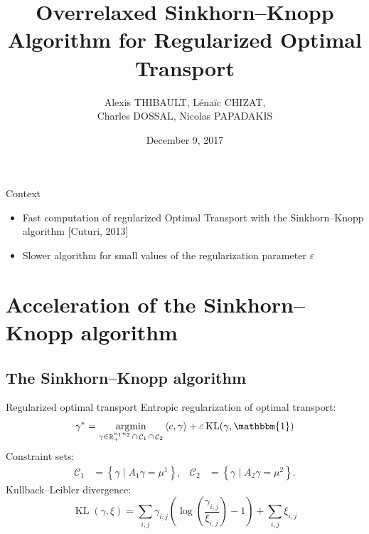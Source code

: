 \documentclass[compress]{beamer}
\title[Overrelaxed SK Algorithm]{Overrelaxed Sinkhorn--Knopp Algorithm for Regularized Optimal Transport}
\author[A. THIBAULT]{
	Alexis THIBAULT, 
	L\'ena\"ic CHIZAT,\\
	Charles DOSSAL,
	Nicolas PAPADAKIS
}
\institute[OTML'17]{Optimal Transport and Machine Learning workshop \\ NIPS 2017}
\date{December 9, 2017}
\newcommand{\scal}[2]{\left\langle #1 , #2 \right\rangle}
\DeclareMathOperator{\IR}{\mathbb{R}}
\DeclareMathOperator*{\argmin}{argmin}
\DeclareMathOperator{\One}{\mathbbm{1}}
\DeclareMathOperator{\Ccal}{\mathcal{C}}
\DeclareMathOperator{\KL}{KL}
\renewcommand{\epsilon}{\varepsilon}
\begin{document}
\titlepage

\begin{frame}
{Context} 
\begin{itemize}
\item Fast computation of regularized Optimal Transport with the Sinkhorn--Knopp algorithm  {\color{blue}[Cuturi, 2013]}
\item Slower algorithm for small values of the regularization parameter $\epsilon$
\end{itemize}
\end{frame}

\section[Overrelaxing SK]{Acceleration of  the Sinkhorn--Knopp algorithm }

\subsection[SK algorithm]{The Sinkhorn--Knopp algorithm}
\begin{frame}{Regularized optimal transport}
Entropic regularization of optimal transport:
\begin{equation*} \label{eq:problem}
\gamma^* = \argmin_{\gamma \in \IR^{n_1 n_2}_+ \cap \Ccal_1 \cap \Ccal_2}
	\scal{c}{\gamma} + \epsilon \KL(\gamma,\One)
\end{equation*}
\pause
Constraint sets:
\begin{align*}
\Ccal_1 &= \left\{ \gamma \mid A_1 \gamma = \mu^1 \right\},
&
\Ccal_2 &= \left\{ \gamma \mid A_2 \gamma = \mu^2 \right\}.
\end{align*}
\pause
Kullback--Leibler divergence:
\begin{equation*}\label{KL}
\KL(\gamma,\xi) = \sum_{i,j} \gamma_{i,j} \left( \log \left( \frac{\gamma_{i,j}}{\xi_{i,j}} \right) -1  \right) + \sum_{i,j} \xi_{i,j}
\end{equation*}
\end{frame}
\end{document}
